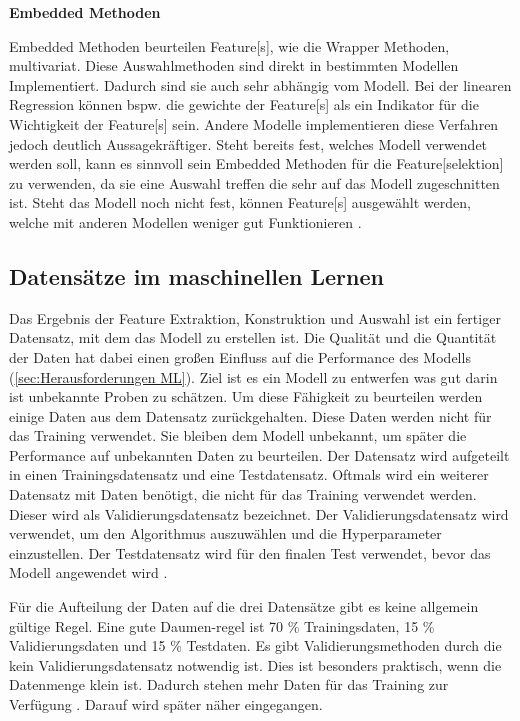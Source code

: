\textbf{\gls{Embedded Methoden}}\par

 \gls{Embedded Methoden} beurteilen \gls{Feature}[s], wie die \gls{Wrapper Methoden}, multivariat. Diese Auswahlmethoden sind direkt in bestimmten Modellen Implementiert. Dadurch sind sie auch sehr abhängig vom Modell. Bei der linearen Regression können bspw. die gewichte der \gls{Feature}[s] als ein Indikator für die Wichtigkeit der \gls{Feature}[s] sein. Andere Modelle implementieren diese Verfahren jedoch deutlich Aussagekräftiger. Steht bereits fest, welches Modell verwendet werden soll, kann es sinnvoll sein \gls{Embedded Methoden} für die \gls{Feature}[selektion] zu verwenden, da sie eine Auswahl treffen die sehr auf das Modell zugeschnitten ist. Steht das Modell noch nicht fest, können \gls{Feature}[s] ausgewählt werden, welche mit anderen Modellen weniger gut Funktionieren \cite{Guyon.2003, Zheng.2018}.

 \subsection{Datensätze im maschinellen Lernen} \label{sec:Datensätze ML}
 Das Ergebnis der Feature Extraktion, Konstruktion und Auswahl ist ein fertiger Datensatz, mit dem das Modell zu erstellen ist. Die Qualität und die Quantität der Daten hat dabei einen großen Einfluss auf die Performance des Modells (\ref{sec:Herausforderungen ML}). Ziel ist es ein Modell zu entwerfen was gut darin ist unbekannte Proben zu schätzen. Um diese Fähigkeit zu beurteilen werden einige Daten aus dem Datensatz zurückgehalten. Diese Daten werden nicht für das Training verwendet. Sie bleiben dem Modell unbekannt, um später die Performance auf unbekannten Daten zu beurteilen. Der Datensatz wird aufgeteilt in einen \gls{Trainingsdatensatz} und eine \gls{Testdatensatz}. Oftmals wird ein weiterer Datensatz mit Daten benötigt, die nicht für das Training verwendet werden. Dieser wird als Validierungsdatensatz bezeichnet. Der Validierungsdatensatz wird verwendet, um den Algorithmus auszuwählen und die \gls{Hyperparameter} einzustellen. Der Testdatensatz wird für den finalen Test verwendet, bevor das Modell angewendet wird \cite{Burkov.2019}. \par

 Für die Aufteilung der Daten auf die drei Datensätze gibt es keine allgemein gültige Regel. Eine gute Daumen-regel ist 70 \% Trainingsdaten, 15 \% Validierungsdaten und 15 \% Testdaten. Es gibt Validierungsmethoden durch die kein Validierungsdatensatz notwendig ist. Dies ist besonders praktisch, wenn die Datenmenge klein ist. Dadurch stehen mehr Daten für das Training zur Verfügung \cite{Burkov.2019}. Darauf wird später näher eingegangen. 


